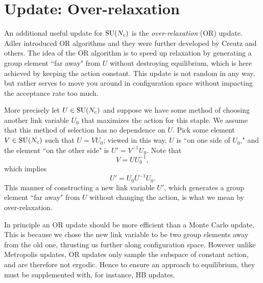 \section{Update: Over-relaxation}

An additional useful update for $\operatorname{SU}(N_c)$ is the 
{\it over-relaxation} (OR) update. 
Adler introduced OR algorithms \cite{adler_over-relaxation_1981} and 
they were further developed by Creutz \cite{creutz_overrelaxation_1987} 
and others. The idea of the OR algorithm is to speed up relaxation 
by generating a group element ``far away" from $U$ without
destroying equilibrium, which is here achieved by keeping the action constant.
This update is not random in any way, but rather serves to move you around
in configuration space without impacting the acceptance rate too much.

More precisely let $U\in\operatorname{SU}(N_c)$ and suppose we have some method of
choosing another link variable $U_0$ that maximizes
the action for this staple.  We assume that this method of selection has no
dependence on $U$.  Pick some element $V\in\operatorname{SU}(N_c)$ such that $U=VU_0$; viewed
in this way, $U$ is ``on one side of $U_0$," and the element 
``on the other side" is $U'=V^{-1}U_0$.  Note that
\begin{equation}
  V=U U_0^{-1},
\end{equation}
which implies
\begin{equation}
  U' = U_0 U^{-1} U_0.
\end{equation}
This manner of constructing a new link variable $U'$, which generates
a group element ``far away" from $U$ without changing the action, 
is what we mean by over-relaxation.

In principle an OR update should be more efficient than a Monte
Carlo update. This is because we chose the new link variable to be two
group elements away from the old one, thrusting us further
along configuration space. However unlike Metropolis updates, OR updates 
only sample the subspace of constant action, and are therefore not ergodic. 
Hence to ensure an approach to equilibrium, they must be supplemented with, 
for instance, HB updates.

